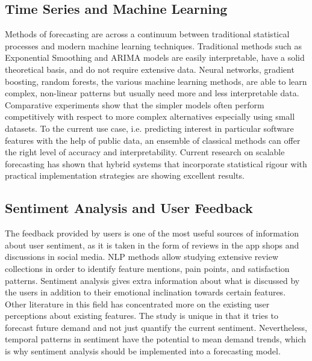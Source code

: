\subsection{Time Series and Machine Learning}
Methods of forecasting are across a continuum between traditional statistical processes and modern machine learning techniques. Traditional methods such as Exponential Smoothing and ARIMA models are easily interpretable, have a solid theoretical basis, and do not require extensive data. Neural networks, gradient boosting, random forests, the various machine learning methods, are able to learn complex, non-linear patterns but usually need more and less interpretable data. Comparative experiments show that the simpler models often perform competitively with respect to more complex alternatives especially using small datasets. To the current use case, i.e. predicting interest in particular software features with the help of public data, an ensemble of classical methods can offer the right level of accuracy and interpretability. Current research on scalable forecasting has shown that hybrid systems that incorporate statistical rigour with practical implementation strategies are showing excellent results.

\subsection{Sentiment Analysis and User Feedback}
The feedback provided by users is one of the most useful sources of information about user sentiment, as it is taken in the form of reviews in the app shops and discussions in social media. NLP methods allow studying extensive review collections in order to identify feature mentions, pain points, and satisfaction patterns. Sentiment analysis gives extra information about what is discussed by the users in addition to their emotional inclination towards certain features. Other literature in this field has concentrated more on the existing user perceptions about existing features. The study is unique in that it tries to forecast future demand and not just quantify the current sentiment. Nevertheless, temporal patterns in sentiment have the potential to mean demand trends, which is why sentiment analysis should be implemented into a forecasting model.

